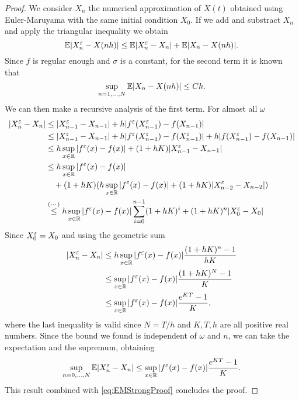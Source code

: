 \begin{proof} We consider $X_n$ the numerical approximation of $X(t)$ obtained using Euler-Maruyama with the same initial condition $X_0$. If we add and substract $X_n$ and apply the triangular inequality we obtain
\begin{equation*}
	\mathbb{E} |X_n^\varepsilon - X(nh)| \leq \mathbb{E} |X_n^\varepsilon - X_n| + \mathbb{E} |X_n - X(nh)|. \\
\end{equation*}
Since $f$ is regular enough and $\sigma$ is a constant, for the second term it is known that
\begin{equation}\label{eq:EMStrongProof}
	\sup_{n = 1, \dots, N} \mathbb{E} |X_n - X(nh)| \leq C h.
\end{equation}
We can then make a recursive analysis of the first term. For almost all $\omega$
\begin{equation*}
\begin{aligned}
	|X^\varepsilon_n - X_n| &\leq |X_{n-1}^\varepsilon - X_{n-1}| + h|f^\varepsilon(X^\varepsilon_{n-1}) - f(X_{n-1})|  \\
	&\leq |X_{n-1}^\varepsilon - X_{n-1}| + h|f^\varepsilon(X^\varepsilon_{n-1}) - f(X^\varepsilon_{n-1})| + h|f(X^\varepsilon_{n-1}) - f(X_{n-1})| \\
	&\leq h \sup_{x \in \mathbb{R}} |f^\varepsilon(x) - f(x)| + (1 + hK) |X_{n-1}^\varepsilon - X_{n-1}| \\
	&\leq h \sup_{x \in \mathbb{R}} |f^\varepsilon(x) - f(x)| \\
	&\quad + (1 + hK) (h \sup_{x \in \mathbb{R}} |f^\varepsilon(x) - f(x)| + (1 + hK)|X_{n-2}^\varepsilon - X_{n-2}|) \\
	&\stackrel{(\cdots)}{\leq} h \sup_{x \in \mathbb{R}} |f^\varepsilon(x) - f(x)| \sum_{i = 0}^{n-1} (1 + hK)^i + (1 + hK)^n |X_0^\varepsilon - X_0|
\end{aligned}
\end{equation*}
Since $X_0^\varepsilon = X_0$ and using the geometric sum
\begin{equation*}
\begin{aligned}
	|X^\varepsilon_n - X_n| &\leq h \sup_{x \in \mathbb{R}} |f^\varepsilon(x) - f(x)| \frac{(1 + hK)^n - 1}{hK} \\
	&\leq \sup_{x \in \mathbb{R}} |f^\varepsilon(x) - f(x)| \frac{(1 + hK)^N - 1}{K} \\
	&\leq \sup_{x \in \mathbb{R}} |f^\varepsilon(x) - f(x)| \frac{e^{KT} - 1}{K},
\end{aligned}
\end{equation*}
where the last inequality is valid since $N = T/h$ and $K, T, h$ are all positive real numbers. Since the bound we found is independent of $\omega$ and $n$, we can take the expectation and the supremum, obtaining
\begin{equation*}
	\sup_{n = 0, \dots, N} \mathbb{E} |X^\varepsilon_n - X_n| \leq \sup_{x \in \mathbb{R}} |f^\varepsilon(x) - f(x)| \frac{e^{KT} - 1}{K}.
\end{equation*}
This result combined with \eqref{eq:EMStrongProof} concludes the proof.
\end{proof}
